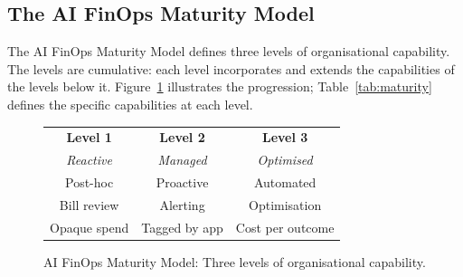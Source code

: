 \documentclass[11pt,twocolumn]{article}
\begin{document}
\subsection{The AI FinOps Maturity Model}
\label{sec:maturity}

The AI FinOps Maturity Model defines three levels of organisational capability.
The levels are cumulative: each level incorporates and extends the capabilities
of the levels below it. Figure~\ref{fig:maturity} illustrates the progression;
Table~\ref{tab:maturity} defines the specific capabilities at each level.

\begin{figure}[H]
\centering
\small
\begin{tabular}{ccc}
\toprule
\textbf{Level 1} & \textbf{Level 2} & \textbf{Level 3} \\
\textit{Reactive} & \textit{Managed} & \textit{Optimised} \\
\midrule
Post-hoc         & Proactive        & Automated \\
Bill review      & Alerting         & Optimisation \\
Opaque spend     & Tagged by app    & Cost per outcome \\
\bottomrule
\end{tabular}
\caption{AI FinOps Maturity Model: Three levels of organisational capability.}
\label{fig:maturity}
\end{figure}
\end{document}
